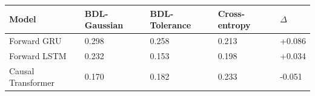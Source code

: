 \begin{tabular}{lllll}
\toprule
Model & BDL-Gaussian & BDL-Tolerance & Cross-entropy & $\Delta$ \\
\midrule
Forward GRU & 0.298 & 0.258 & 0.213 & +0.086 \\
Forward LSTM & 0.232 & 0.153 & 0.198 & +0.034 \\
Causal Transformer & 0.170 & 0.182 & 0.233 & -0.051 \\
\bottomrule
\end{tabular}
